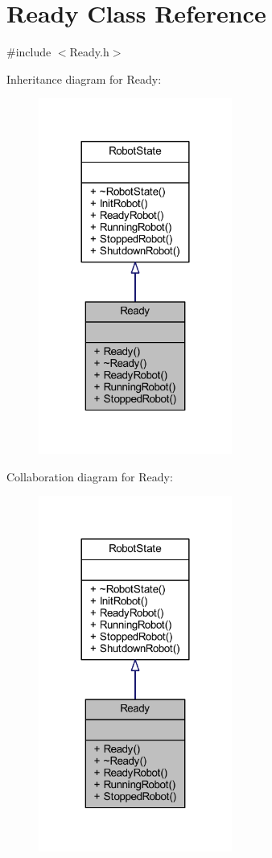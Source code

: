 \hypertarget{class_ready}{}\section{Ready Class Reference}
\label{class_ready}


{\ttfamily \#include $<$Ready.\+h$>$}



Inheritance diagram for Ready\+:
\nopagebreak
\begin{figure}[H]
\begin{center}
\leavevmode
\includegraphics[width=180pt]{class_ready__inherit__graph}
\end{center}
\end{figure}


Collaboration diagram for Ready\+:
\nopagebreak
\begin{figure}[H]
\begin{center}
\leavevmode
\includegraphics[width=180pt]{class_ready__coll__graph}
\end{center}
\end{figure}
